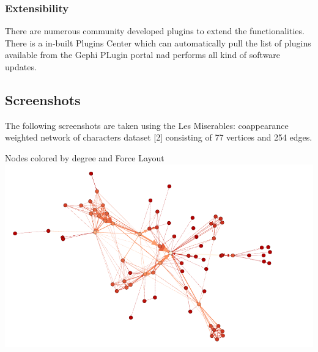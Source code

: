 \documentclass[11pt,a4paper,oneside]{article}
\begin{document}
	\subsubsection{Extensibility}
	There are numerous community developed plugins to extend the functionalities. There is a in-built Plugins Center which can automatically pull the list of plugins available from the Gephi PLugin portal nad performs all kind of software updates.
	
	\subsection{Screenshots}	
	The following screenshots are taken using the Les Miserables: coappearance weighted network of characters dataset [2] consisting of 77 vertices and 254 edges.

	
	\begin{center}
		Nodes colored by degree and Force Layout \\
		\includegraphics[scale=0.6]{1.png}				   
	\end{center}
  
    \begin{verbatim}
    
    
    \end{verbatim}
    
\end{document}
